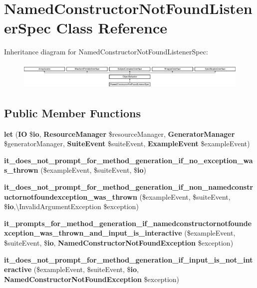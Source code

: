 \section{Named\+Constructor\+Not\+Found\+Listener\+Spec Class Reference}
\label{classspec_1_1_php_spec_1_1_listener_1_1_named_constructor_not_found_listener_spec}
Inheritance diagram for Named\+Constructor\+Not\+Found\+Listener\+Spec\+:\begin{figure}[H]
\begin{center}
\leavevmode
\includegraphics[height=1.322835cm]{classspec_1_1_php_spec_1_1_listener_1_1_named_constructor_not_found_listener_spec}
\end{center}
\end{figure}
\subsection*{Public Member Functions}
\begin{DoxyCompactItemize}
\item 
{\bf let} ({\bf I\+O} \${\bf io}, {\bf Resource\+Manager} \$resource\+Manager, {\bf Generator\+Manager} \$generator\+Manager, {\bf Suite\+Event} \$suite\+Event, {\bf Example\+Event} \$example\+Event)
\item 
{\bf it\+\_\+does\+\_\+not\+\_\+prompt\+\_\+for\+\_\+method\+\_\+generation\+\_\+if\+\_\+no\+\_\+exception\+\_\+was\+\_\+thrown} (\$example\+Event, \$suite\+Event, \${\bf io})
\item 
{\bf it\+\_\+does\+\_\+not\+\_\+prompt\+\_\+for\+\_\+method\+\_\+generation\+\_\+if\+\_\+non\+\_\+namedconstructornotfoundexception\+\_\+was\+\_\+thrown} (\$example\+Event, \$suite\+Event, \${\bf io},\textbackslash{}Invalid\+Argument\+Exception \$exception)
\item 
{\bf it\+\_\+prompts\+\_\+for\+\_\+method\+\_\+generation\+\_\+if\+\_\+namedconstructornotfoundexception\+\_\+was\+\_\+thrown\+\_\+and\+\_\+input\+\_\+is\+\_\+interactive} (\$example\+Event, \$suite\+Event, \${\bf io}, {\bf Named\+Constructor\+Not\+Found\+Exception} \$exception)
\item 
{\bf it\+\_\+does\+\_\+not\+\_\+prompt\+\_\+for\+\_\+method\+\_\+generation\+\_\+if\+\_\+input\+\_\+is\+\_\+not\+\_\+interactive} (\$example\+Event, \$suite\+Event, \${\bf io}, {\bf Named\+Constructor\+Not\+Found\+Exception} \$exception)
\end{DoxyCompactItemize}
